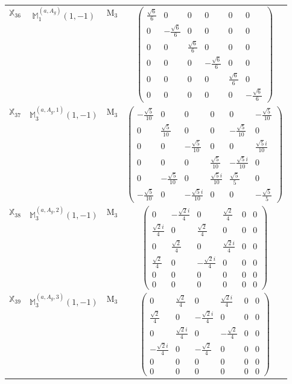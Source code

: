 \documentclass[fleqn,10pt,landscape]{article}
\begin{document}
\begin{itemize}
\begin{center}
\begin{longtable}{c|c|c|c}
$ \mathbb{X}_{36} $ & $\mathbb{M}_{1}^{(a,A_{g})}(1,-1)$ & M$_{3}$ & $\begin{pmatrix} \frac{\sqrt{6}}{6} & 0 & 0 & 0 & 0 & 0 \\ 0 & - \frac{\sqrt{6}}{6} & 0 & 0 & 0 & 0 \\ 0 & 0 & \frac{\sqrt{6}}{6} & 0 & 0 & 0 \\ 0 & 0 & 0 & - \frac{\sqrt{6}}{6} & 0 & 0 \\ 0 & 0 & 0 & 0 & \frac{\sqrt{6}}{6} & 0 \\ 0 & 0 & 0 & 0 & 0 & - \frac{\sqrt{6}}{6} \end{pmatrix}$ \\
$ \mathbb{X}_{37} $ & $\mathbb{M}_{3}^{(a,A_{g},1)}(1,-1)$ & M$_{3}$ & $\begin{pmatrix} - \frac{\sqrt{5}}{10} & 0 & 0 & 0 & 0 & - \frac{\sqrt{5}}{10} \\ 0 & \frac{\sqrt{5}}{10} & 0 & 0 & - \frac{\sqrt{5}}{10} & 0 \\ 0 & 0 & - \frac{\sqrt{5}}{10} & 0 & 0 & \frac{\sqrt{5} i}{10} \\ 0 & 0 & 0 & \frac{\sqrt{5}}{10} & - \frac{\sqrt{5} i}{10} & 0 \\ 0 & - \frac{\sqrt{5}}{10} & 0 & \frac{\sqrt{5} i}{10} & \frac{\sqrt{5}}{5} & 0 \\ - \frac{\sqrt{5}}{10} & 0 & - \frac{\sqrt{5} i}{10} & 0 & 0 & - \frac{\sqrt{5}}{5} \end{pmatrix}$ \\
$ \mathbb{X}_{38} $ & $\mathbb{M}_{3}^{(a,A_{g},2)}(1,-1)$ & M$_{3}$ & $\begin{pmatrix} 0 & - \frac{\sqrt{2} i}{4} & 0 & \frac{\sqrt{2}}{4} & 0 & 0 \\ \frac{\sqrt{2} i}{4} & 0 & \frac{\sqrt{2}}{4} & 0 & 0 & 0 \\ 0 & \frac{\sqrt{2}}{4} & 0 & \frac{\sqrt{2} i}{4} & 0 & 0 \\ \frac{\sqrt{2}}{4} & 0 & - \frac{\sqrt{2} i}{4} & 0 & 0 & 0 \\ 0 & 0 & 0 & 0 & 0 & 0 \\ 0 & 0 & 0 & 0 & 0 & 0 \end{pmatrix}$ \\
$ \mathbb{X}_{39} $ & $\mathbb{M}_{3}^{(a,A_{g},3)}(1,-1)$ & M$_{3}$ & $\begin{pmatrix} 0 & \frac{\sqrt{2}}{4} & 0 & \frac{\sqrt{2} i}{4} & 0 & 0 \\ \frac{\sqrt{2}}{4} & 0 & - \frac{\sqrt{2} i}{4} & 0 & 0 & 0 \\ 0 & \frac{\sqrt{2} i}{4} & 0 & - \frac{\sqrt{2}}{4} & 0 & 0 \\ - \frac{\sqrt{2} i}{4} & 0 & - \frac{\sqrt{2}}{4} & 0 & 0 & 0 \\ 0 & 0 & 0 & 0 & 0 & 0 \\ 0 & 0 & 0 & 0 & 0 & 0 \end{pmatrix}$ \\

\end{longtable}
\end{center}
\end{itemize}
\end{document}
